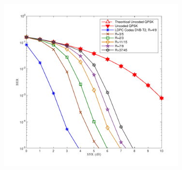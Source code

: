 \begin{figure}[H]
	\centering
	\begin{minipage}{1\linewidth}
		\hspace{0.75 cm}
		\includegraphics[width=0.85\textwidth]{hasildsfix.pdf}
		\vspace{-1cm}
		

\end{minipage}
\end{figure}
